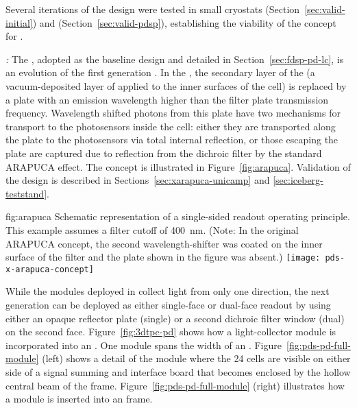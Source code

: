 Several iterations of the  design were tested in small cryostats (Section~\ref{sec:valid-initial}) and  (Section~\ref{sec:valid-pdsp}), establishing the viability of the concept for .

\textit{:} The , adopted as the baseline design and detailed in 
Section~\ref{sec:fdsp-pd-lc}, is an evolution of the first generation .  In the , the secondary  layer of the  (a vacuum-deposited layer of  applied to the inner surfaces of the cell) is replaced by a  plate with an emission wavelength higher than the filter plate transmission frequency.  Wavelength shifted photons from this plate have two mechanisms for transport to the photosensors inside the cell: either they are transported along the  plate to the photosensors via total internal reflection, or those escaping the plate are captured due to reflection from the dichroic filter by the standard ARAPUCA effect.
The concept is illustrated in Figure~\ref{fig:arapuca}.
Validation of the  design is described in Sections~\ref{sec:xarapuca-unicamp} and \ref{sec:iceberg-teststand}.

\begin{dunefigure}{fig:arapuca}
{Schematic representation of a single-sided readout   operating principle.  This example assumes a filter cutoff of \SI{400}{nm}. (Note: In the original ARAPUCA concept, the second wavelength-shifter was coated on the inner surface of the filter and the  plate shown in the figure was absent.)}               
\texttt{[image: pds-x-arapuca-concept]}   
\end{dunefigure}

While the  modules deployed in  collect light from only one direction, the next generation  can be deployed as either single-face or dual-face readout by using either an opaque reflector plate (single) or a second dichroic filter window (dual) on the second face. 
Figure~\ref{fig:3dtpc-pd} shows how a light-collector module is incorporated into an . One module spans the width of an . Figure~\ref{fig:pds-pd-full-module} (left) shows a detail of the module where the 24  cells are visible on either side of a signal summing and interface board that becomes enclosed by the hollow central beam of the  frame. Figure~\ref{fig:pds-pd-full-module} (right) illustrates how a module is inserted into an  frame.


